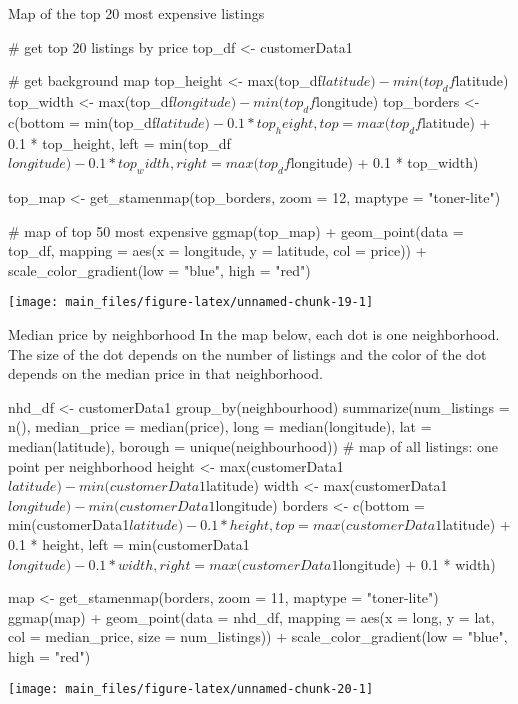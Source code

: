 Map of the top 20 most expensive listings

\begin{Schunk}
\begin{Sinput}
# get top 20 listings by price
top_df <- customerData1 %>% top_n(n = 20, wt = price)

# get background map
top_height <- max(top_df$latitude) - min(top_df$latitude)
top_width <- max(top_df$longitude) - min(top_df$longitude)
top_borders <- c(bottom  = min(top_df$latitude)  - 0.1 * top_height,
                 top     = max(top_df$latitude)  + 0.1 * top_height,
                 left    = min(top_df$longitude) - 0.1 * top_width,
                 right   = max(top_df$longitude) + 0.1 * top_width)

top_map <- get_stamenmap(top_borders, zoom = 12, maptype = "toner-lite")

# map of top 50 most expensive
ggmap(top_map) +
    geom_point(data = top_df, mapping = aes(x = longitude, y = latitude,
                                        col = price)) +
    scale_color_gradient(low = "blue", high = "red")
\end{Sinput}


\begin{center}\texttt{[image: main\_files/figure-latex/unnamed-chunk-19-1]} \end{center}

\end{Schunk}

Median price by neighborhood In the map below, each dot is one
neighborhood. The size of the dot depends on the number of listings and
the color of the dot depends on the median price in that neighborhood.

\begin{Schunk}
\begin{Sinput}
nhd_df <- customerData1 %>%
    group_by(neighbourhood) %>%
    summarize(num_listings = n(),
              median_price = median(price),
              long = median(longitude),
              lat = median(latitude),
              borough = unique(neighbourhood))
# map of all listings: one point per neighborhood
height <- max(customerData1$latitude) - min(customerData1$latitude)
width <- max(customerData1$longitude) - min(customerData1$longitude)
borders <- c(bottom  = min(customerData1$latitude)  - 0.1 * height,
             top     = max(customerData1$latitude)  + 0.1 * height,
             left    = min(customerData1$longitude) - 0.1 * width,
             right   = max(customerData1$longitude) + 0.1 * width)

map <- get_stamenmap(borders, zoom = 11, maptype = "toner-lite")
ggmap(map) +
    geom_point(data = nhd_df, mapping = aes(x = long, y = lat,
                                            col = median_price, size = num_listings)) +
    scale_color_gradient(low = "blue", high = "red")
\end{Sinput}


\begin{center}\texttt{[image: main\_files/figure-latex/unnamed-chunk-20-1]} \end{center}

\end{Schunk}

